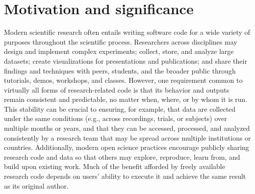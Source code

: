 \documentclass[preprint,12pt, a4paper]{elsarticle}
\begin{document}
\section{Motivation and significance}
Modern scientific research often entails writing software code for a wide variety of purposes throughout the scientific process.
Researchers across disciplines may design and implement complex experiments; collect, store, and analyze large datasets; create visualizations for presentations and publications; and share their findings and techniques with peers, students, and the broader public through tutorials, demos, workshops, and classes.
However, one requirement common to virtually all forms of research-related code is that its behavior and outputs remain consistent and predictable, no matter when, where, or by whom it is run.
This stability can be crucial to ensuring, for example, that data are collected under the same conditions (e.g., across recordings, trials, or subjects)
over multiple months or years, and that they can be accessed, processed, and analyzed consistently by a research team that may be spread across multiple institutions or countries.
Additionally, modern open science practices encourage publicly sharing research code and data so that others may explore, reproduce, learn from, and build upon existing work.
Much of the benefit afforded by freely available research code depends on users' ability to execute it and achieve the same result as its original author.
\end{document}
